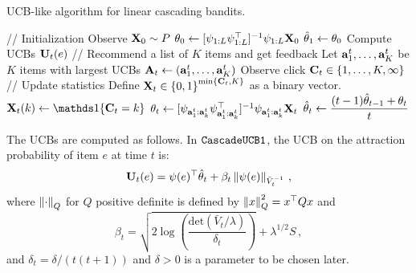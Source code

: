 \begin{algorithm}[t]
  \caption{UCB-like algorithm for linear cascading bandits.}
  \label{alg:ucb}
  \begin{algorithmic}
    \STATE // Initialization
    \STATE Observe $\mathbf{X}_0 \sim P$
    \STATE $\mathbf{\theta}_0 \gets [\psi_{1:L} \psi_{1:L}^\top]^{-1} \psi_{1:L} \mathbf{X}_0$
    \STATE $\hat{\mathbf{\theta}}_1 \gets \mathbf{\theta}_0$
    \STATE
      \STATE Compute UCBs $\mathbf{U}_t(e)$ %
      \STATE
      \STATE // Recommend a list of $K$ items and get feedback
      \STATE Let $\mathbf{a}^t_1, \dots, \mathbf{a}^t_K$ be $K$ items with largest UCBs
      \STATE $\mathbf{A}_t \gets (\mathbf{a}^t_1, \dots, \mathbf{a}^t_K)$
      \STATE Observe click $\mathbf{C}_t \in \left\{1, \dots, K, \infty\right\}$
      \STATE
      \STATE // Update statistics
      \STATE Define $\mathbf{X}_t \in \left\{0,1\right\}^{\min \left\{\mathbf{C}_t, K\right\}}$ as a binary vector.
        \STATE $\rnd{X}_t(k) \gets \I{\rnd{C}_t = k}$
      \ENDFOR
      \STATE $\mathbf{\theta}_t \gets [\psi_{\mathbf{a}^t_1:\mathbf{a}^t_k} \psi_{\mathbf{a}^t_1:\mathbf{a}^t_k}^\top]^{-1} \psi_{\mathbf{a}^t_1:\mathbf{a}^t_k} \mathbf{X}_t$
      \STATE $\displaystyle \hat{\mathbf{\theta}}_t \gets \frac{(t - 1) \hat{\mathbf{\theta}}_{t - 1} + \mathbf{\theta}_t}{t}$
    \ENDFOR
  \end{algorithmic}
\end{algorithm}

The UCBs are computed as follows. In ${\tt CascadeUCB1}$, the UCB on the attraction probability of item $e$ at time $t$ is:
\begin{align*}
  \mathbf{U}_t(e) = \psi(e)^\top \hat{\mathbf{\theta}}_t + \beta_t \left\|\psi(e) \right\|_{\bar{V}_t^{-1}}\,,
\end{align*}
where $\left\|\cdot\right\|_Q$ for $Q$ positive definite is defined by
$\left\|x\right\|^2_Q  = x^\top Q x$ and
\[
\beta_t = \sqrt{2 \log\left(\frac{\mathrm{det}(\bar{V}_t/\lambda)}{\delta_t}\right)} + \lambda^{1/2} S\,,
\]
and $\delta_t = \delta/(t(t+1))$ and $\delta>0$ is a parameter to be chosen later.
